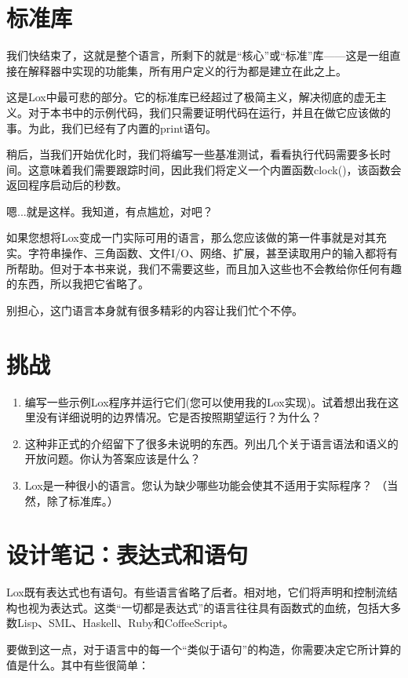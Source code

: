 \documentclass[cn,11pt,chinese]{elegantbook}
\begin{document}
\section{标准库}

我们快结束了，这就是整个语言，所剩下的就是“核心”或“标准”库——这是一组直接在解释器中实现的功能集，所有用户定义的行为都是建立在此之上。

这是Lox中最可悲的部分。它的标准库已经超过了极简主义，解决彻底的虚无主义。对于本书中的示例代码，我们只需要证明代码在运行，并且在做它应该做的事。为此，我们已经有了内置的print语句。

稍后，当我们开始优化时，我们将编写一些基准测试，看看执行代码需要多长时间。这意味着我们需要跟踪时间，因此我们将定义一个内置函数clock()，该函数会返回程序启动后的秒数。

嗯...就是这样。我知道，有点尴尬，对吧？ 

如果您想将Lox变成一门实际可用的语言，那么您应该做的第一件事就是对其充实。字符串操作、三角函数、文件I/O、网络、扩展，甚至读取用户的输入都将有所帮助。但对于本书来说，我们不需要这些，而且加入这些也不会教给你任何有趣的东西，所以我把它省略了。

别担心，这门语言本身就有很多精彩的内容让我们忙个不停。

\section{挑战}

\begin{enumerate}
  \item 编写一些示例Lox程序并运行它们(您可以使用我的Lox实现)。试着想出我在这里没有详细说明的边界情况。它是否按照期望运行？为什么？
  \item 这种非正式的介绍留下了很多未说明的东西。列出几个关于语言语法和语义的开放问题。你认为答案应该是什么？
  \item Lox是一种很小的语言。您认为缺少哪些功能会使其不适用于实际程序？ （当然，除了标准库。）
\end{enumerate}

\section{设计笔记：表达式和语句}

Lox既有表达式也有语句。有些语言省略了后者。相对地，它们将声明和控制流结构也视为表达式。这类“一切都是表达式”的语言往往具有函数式的血统，包括大多数Lisp、SML、Haskell、Ruby和CoffeeScript。

要做到这一点，对于语言中的每一个“类似于语句”的构造，你需要决定它所计算的值是什么。其中有些很简单：
\end{document}
